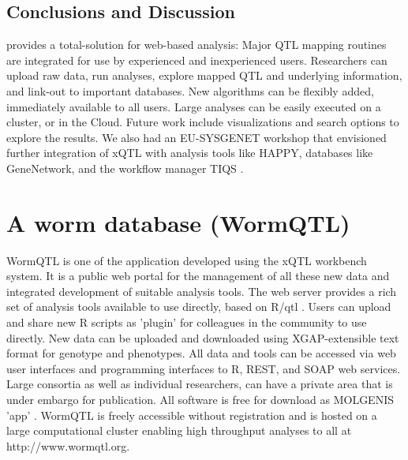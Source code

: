 \subsection{Conclusions and Discussion}
\xqtlwb provides a total-solution for web-based analysis: Major QTL mapping routines are integrated 
for use by experienced and inexperienced users. Researchers can upload raw data, run analyses, explore 
mapped QTL and underlying information, and link-out to important databases. New algorithms can be 
flexibly added, immediately available to all users. Large analyses can be easily executed on a cluster, 
or in the Cloud. Future work include visualizations and search options to explore the results. We also 
had an EU-SYSGENET workshop that envisioned further integration of xQTL with analysis tools like HAPPY, 
databases like GeneNetwork, and the workflow manager TIQS \cite{Durrant:2012}.

\section{A worm database (WormQTL)}
WormQTL is one of the application developed using the xQTL workbench system. It is a public web portal 
for the management of all these new data and integrated development of suitable analysis tools. The 
web server provides a rich set of analysis tools available to use directly, based on R/qtl 
\cite{Broman:2003, Arends:2010}. Users can upload and share new R scripts as 'plugin' for colleagues 
in the community to use directly. New data can be uploaded and downloaded using XGAP-extensible 
text format for genotype and phenotypes\cite{Swertz:2010a}. All data and tools can be accessed 
via web user interfaces and programming interfaces to R, REST, and SOAP web services. Large 
consortia as well as individual researchers, can have a private area that is under embargo for 
publication. All software is free for download as MOLGENIS 'app' \cite{Swertz:2010b}. WormQTL is 
freely accessible without registration and is hosted on a large computational cluster enabling 
high throughput analyses to all at http://www.wormqtl.org.


